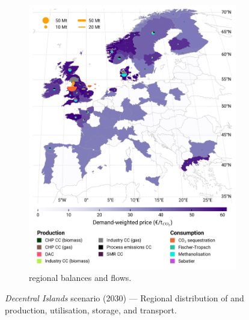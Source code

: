 \documentclass[preprint,12pt,sort&compress]{elsarticle}
\begin{document}
\begin{figure}[htbp]
\begin{subfigure}[t]{0.49\textwidth}
      \includegraphics[width=1\textwidth]{maps/no-pipelines-no-pcipmi/base_s_adm___2030-balance_map_co2_stored} 
      \vspace{-0.7cm}
      \caption{ regional balances and flows.}
      \label{fig:DI_lt_2030_co2}
  \end{subfigure}
  \caption{\textit{Decentral Islands} scenario (2030) --- Regional distribution of  and  production, utilisation, storage, and transport.}
  \label{fig:DI_lt_2030}
\end{figure}
\end{document}
